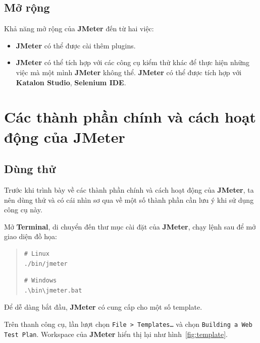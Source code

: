 \documentclass[12pt]{report}
\newcommand{\jmeter}{\textbf{JMeter}}
\begin{document}
\section{Mở rộng}

\par Khả năng mở rộng của \jmeter{} đến từ hai việc:

\begin{itemize}
    \item \jmeter{} có thể được cài thêm plugins.
    \item \jmeter{} có thể tích hợp với các công cụ kiểm thử khác để thực hiện những việc mà một mình \jmeter{} không thể. \jmeter{} có thể được tích hợp với \textbf{Katalon Studio}, \textbf{Selenium IDE}.
\end{itemize}

\chapter{Các thành phần chính và cách hoạt động của JMeter}

\section{Dùng thử}

\par Trước khi trình bày về các thành phần chính và cách hoạt động của \jmeter{}, ta nên dùng thử và có cái nhìn sơ qua về một số thành phần cần lưu ý khi sử dụng công cụ này.

\par Mở \textbf{Terminal}, di chuyển đến thư mục cài đặt của \jmeter{}, chạy lệnh sau để mở giao diện đồ họa:
\begin{quotation}
    \begin{verbatim}
# Linux
./bin/jmeter
\end{verbatim}
    \begin{verbatim}
# Windows
.\bin\jmeter.bat
\end{verbatim}
\end{quotation}

\par Để dễ dàng bắt đầu, \jmeter{} có cung cấp cho một số template.

\par Trên thanh công cụ, lần lượt chọn \texttt{File > Templates\ldots} và chọn \texttt{Building a Web Test Plan}. Workspace của \jmeter{} hiển thị lại như hình~\ref{fig:template}.
\end{document}
